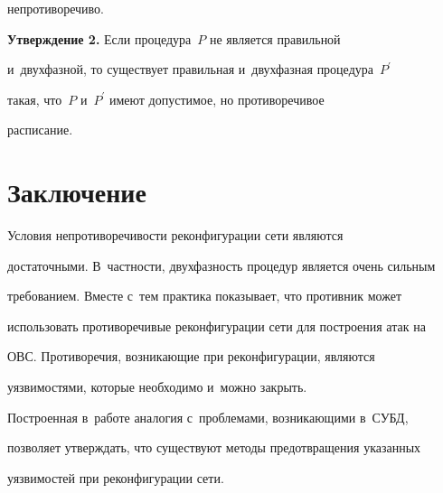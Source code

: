 непротиворечиво. 


  


  \smallskip


  


  \noindent


  \textbf{Утверждение 2.} Если процедура~$P$ не является правильной 


и~двухфазной, то существует правильная и~двухфазная процедура~$P^\prime$ 


такая, что~$P$ и~$P^\prime$ имеют допустимое, но противоречивое 


расписание.


  


\section{Заключение}





     Условия непротиворечивости реконфигурации сети являются 


достаточными. В~частности, двухфазность процедур является очень сильным 


требованием. Вместе с~тем практика показывает, что противник может 


использовать противоречивые реконфигурации сети для построения атак на 


ОВС. Противоречия, возникающие при реконфигурации, являются 


уязвимостями, которые необходимо и~можно закрыть.


     


     Построенная в~работе аналогия с~проблемами, возникающими в~СУБД, 


позволяет утверждать, что существуют методы предотвращения указанных 


уязвимостей при реконфигурации сети.


     


